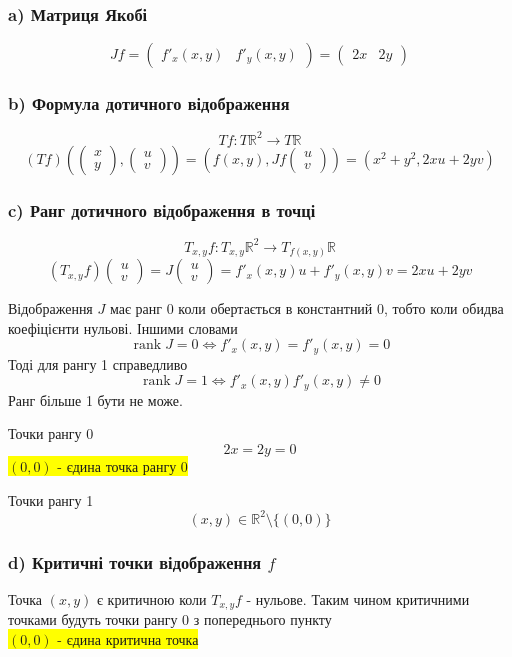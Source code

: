 \documentclass[10pt, a4paper]{article} %
\newcommand{\R}{\mathbb{R}}
\newcommand{\J}{J}
\DeclareMathOperator{\rank}{rank}
\begin{document}
\subsubsection*{a) Матриця Якобі}
\[\J f = \begin{pmatrix}
    f'_x(x,y) & f'_y(x,y)
\end{pmatrix} = \begin{pmatrix}
    2x & 2y
\end{pmatrix}\]

\subsubsection*{b) Формула дотичного відображення}
\[Tf : T\R^2 \to T\R\]
\[(Tf)\left(\begin{pmatrix} x \\ y \end{pmatrix}, \begin{pmatrix} u \\ v \end{pmatrix}\right) 
= \left(f(x,y),\J f \begin{pmatrix} u \\ v \end{pmatrix}\right) 
= \left(x^2+y^2, 2xu+2yv\right)\]

\subsubsection*{c) Ранг дотичного відображення в точці}
\[T_{x,y} f : T_{x,y}\R^2 \to T_{f(x,y)}\R\]
\[(T_{x,y} f) \begin{pmatrix} u \\ v \end{pmatrix}
= J\begin{pmatrix} u \\ v \end{pmatrix} = f'_x(x,y) u + f'_y(x,y) v = 2xu+2yv\]

Відображення $J$ має ранг 0 коли обертається в константний 0, тобто коли обидва коефіцієнти нульові.
Іншими словами
\[\rank J = 0 \iff f'_x(x,y)=f'_y(x,y)=0\]
Тоді для рангу 1 справедливо
\[\rank J = 1 \iff f'_x(x,y)f'_y(x,y) \ne 0\]
Ранг більше 1 бути не може.

Точки рангу 0
\[2x=2y=0\]
\colorbox{yellow}{$(0,0)$ - єдина точка рангу 0}

Точки рангу 1
\[(x,y) \in \R^2 \setminus \{(0,0)\}\]

\subsubsection*{d) Критичні точки відображення $f$}
Точка $(x,y)$ є критичною коли $T_{x,y}f$ - нульове.
Таким чином критичними точками будуть точки рангу 0 з попереднього пункту\\
\colorbox{yellow}{$(0,0)$ - єдина критична точка}
\end{document}
